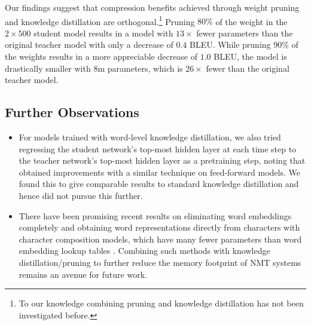 \documentclass[11pt,letterpaper]{article}
\begin{document}
Our findings suggest that compression benefits achieved through 
weight pruning and knowledge distillation are 
orthogonal.\footnote{To our knowledge combining pruning and knowledge distillation has not been investigated before.}
 Pruning $80\%$
 of the weight in the $2 \times 500$ student model results in a model with $13\times$ fewer parameters than the original teacher 
model with only a decrease of $0.4$ BLEU.
 While pruning $90\%$ of the weights results in a more appreciable decrease of $1.0$ BLEU, 
the model is drastically smaller with $8$m parameters, which is $26\times$ fewer than the original teacher model.


\subsection{Further Observations}
\begin{itemize}
\item For models trained with word-level knowledge distillation, we also tried regressing the student network's
top-most hidden layer at each time step to the teacher network's top-most hidden layer as
a pretraining step, noting that  obtained improvements with a 
similar technique on feed-forward models.
We found this to give comparable results to standard knowledge distillation and 
hence did not pursue this further.
\item There have been promising recent results
on eliminating word embeddings completely
and obtaining word representations directly from characters 
with character composition models, which have many fewer parameters than word embedding
lookup tables
\cite{Ling2015,Kim2016,Ling2015b,Jozefowicz2016,Jussa2016}. 
Combining such methods with knowledge distillation/pruning 
to further reduce the memory footprint of
NMT systems remains an avenue for future work.
\end{itemize}
\end{document}
